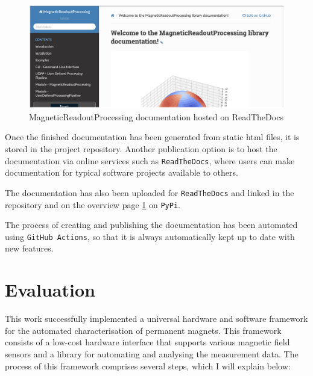 \begin{figure}
\centering
\includegraphics{./generated_images/border_MagneticReadoutProcessing_documentation_hosted_on_ReadTheDocs.png}
\caption{MagneticReadoutProcessing documentation hosted on ReadTheDocs
\label{MagneticReadoutProcessing_documentation_hosted_on_ReadTheDocs.png}}
\end{figure}

Once the finished documentation has been generated from static
\gls{html} files, it is stored in the project repository. Another
publication option is to host the documentation via online services such
as \passthrough{\lstinline!ReadTheDocs!}\cite{ReadTheDocs}, where
users can make documentation for typical software projects available to
others.

The documentation has also been uploaded for
\passthrough{\lstinline!ReadTheDocs!}\cite{MagneticReadoutProcessingReadTheDocs}
and linked in the repository and on the overview page
\ref{MagneticReadoutProcessing_documentation_hosted_on_ReadTheDocs.png}
on \passthrough{\lstinline!PyPi!}.

The process of creating and publishing the documentation has been
automated using
\passthrough{\lstinline!GitHub Actions!}\cite{GithubActions}, so
that it is always automatically kept up to date with new features.

\hypertarget{evaluation}{%
\chapter{Evaluation}\label{evaluation}}

This work successfully implemented a universal hardware and software
framework for the automated characterisation of permanent magnets. This
framework consists of a low-cost hardware interface that supports
various magnetic field sensors and a library for automating and
analysing the measurement data. The process of this framework comprises
several steps, which I will explain below:

